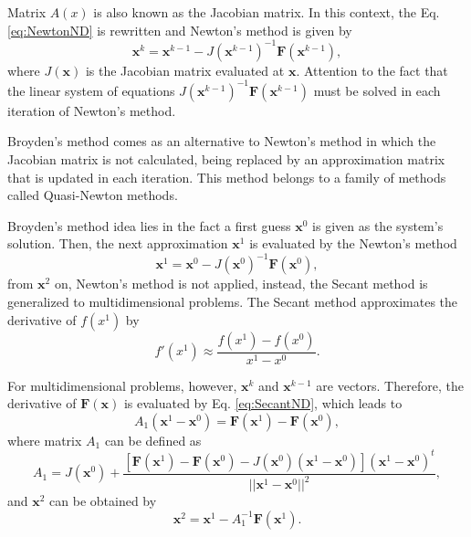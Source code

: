 Matrix $A(x)$ is also known as the Jacobian matrix. In this context, the Eq. \eqref{eq:NewtonND} is rewritten and Newton's method is given by 
\begin{equation}
    \bm{x}^{k} = \bm{x}^{k-1} - J(\bm{x}^{k-1})^{-1} \bm{F}(\bm{x}^{k-1}),
    \label{eq:NewtonNDJ}
\end{equation}
where $J(\bm{x})$ is the Jacobian matrix evaluated at $\bm{x}$. Attention to the fact that the linear system of equations $J(\bm{x}^{k-1})^{-1}\bm{F}(\bm{x}^{k-1})$ must be solved in each iteration of Newton's method.

Broyden's method comes as an alternative to Newton's method in which the Jacobian matrix is not calculated, being replaced by an approximation matrix that is updated in each iteration. This method belongs to a family of methods called Quasi-Newton methods.

Broyden's method idea lies in the fact a first guess $\bm{x}^0$ is given as the system's solution. Then, the next approximation $\bm{x}^1$ is evaluated by the Newton's method 
\begin{equation*}
    \bm{x}^1 = \bm{x}^0 - J(\bm{x}^0)^{-1} \bm{F}(\bm{x}^0),
\end{equation*}
from $\bm{x}^2$ on, Newton's method is not applied, instead, the Secant method is generalized to multidimensional problems. The Secant method approximates the derivative of $f(x^1)$ by 
\begin{equation}
    f'(x^1) \approx \frac{f(x^{1}) - f(x^{0})}{x^{1} - x^{0}}.
\end{equation}

For multidimensional problems, however, $\bm{x}^{k}$ and $\bm{x}^{k-1}$ are vectors. Therefore, the derivative of $\bm{F}(\bm{x})$ is evaluated by Eq. \eqref{eq:SecantND}, which leads to 
\begin{equation}
    A_1(\bm{x}^{1} - \bm{x}^0) = \bm{F}(\bm{x}^{1}) - \bm{F}(\bm{x}^{0}),
\end{equation}
where matrix $A_1$ can be defined as 
\begin{equation*}
    A_1 = J(\bm{x}^{0}) + \frac{\left[\bm{F}(\bm{x}^1) - \bm{F}(\bm{x}^0) - J(\bm{x}^0)\left(\bm{x}^1 - \bm{x}^0\right) \right]\left(\bm{x}^1 - \bm{x}^0\right)^t}{||\bm{x}^1 - \bm{x}^0||^2}, 
\end{equation*}
and $\bm{x}^2$ can be obtained by 
\begin{equation*}
    \bm{x}^2 = \bm{x}^1 - A^{-1}_1 \bm{F}(\bm{x}^1).
\end{equation*}

